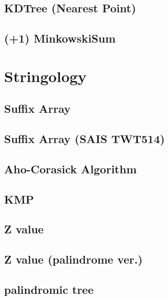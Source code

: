 \documentclass[10pt,twocolumn,oneside]{article}
\begin{document}
\subsection{KDTree (Nearest Point)}


\subsection{(+1) MinkowskiSum}


\newpage

\section{Stringology}
\subsection{Suffix Array}


\subsection{Suffix Array (SAIS TWT514)}


\subsection{Aho-Corasick Algorithm}


\subsection{KMP}


\subsection{Z value}


\subsection{Z value (palindrome ver.)}


\subsection{palindromic tree}

\end{document}
